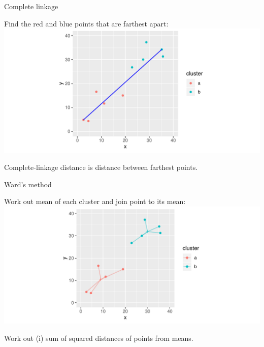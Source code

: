 \documentclass[ignorenonframetext,]{beamer}
\begin{document}
\begin{frame}{Complete linkage}
\protect\hypertarget{complete-linkage}{}

Find the red and blue points that are farthest apart:
\includegraphics{figure/unnamed-chunk-348-1.pdf}

Complete-linkage distance is distance between farthest points.

\end{frame}

\begin{frame}{Ward's method}
\protect\hypertarget{wards-method}{}

Work out mean of each cluster and join point to its mean:
\includegraphics{figure/unnamed-chunk-349-1.pdf}

Work out (i) sum of squared distances of points from means.

\end{frame}
\end{document}
